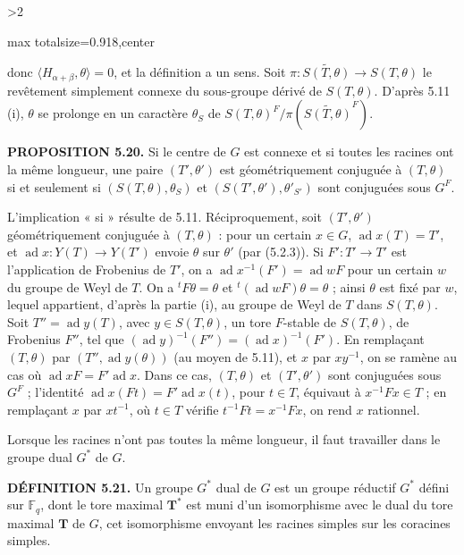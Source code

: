 \documentclass[9pt,twoside]{extarticle}
\newcommand{\EditionPage}[3]{%
  \ifnum#1>2\clearpage\fi
  \pdfbookmark[1]{Printed page #2}{fr-folio-#2}%
  \hypertarget{fr-physical-#1}{}%
  \noindent\begin{adjustbox}{max totalsize={\textwidth}{0.918\textheight},center}
  \begin{minipage}[t]{\textwidth}
  \fontsize{9.4}{11.1}\selectfont\justifying
  #3
  \end{minipage}
  \end{adjustbox}%
}
\begin{document}
\EditionPage{32}{133}{%
donc \(\langle H_{\alpha+\beta},\theta\rangle=0\), et la définition a un sens. Soit \(\pi:\widetilde{S(T,\theta)}\to S(T,\theta)\) le revêtement simplement connexe du sous-groupe dérivé de \(S(T,\theta)\). D'après 5.11 (i), \(\theta\) se prolonge en un caractère \(\theta_S\) de \(S(T,\theta)^F/\pi(\widetilde{S(T,\theta)}^F)\).\par

\noindent\textbf{PROPOSITION 5.20.} Si le centre de \(G\) est connexe et si toutes les racines ont la même longueur, une paire \((T',\theta')\) est géométriquement conjuguée à \((T,\theta)\) si et seulement si \((S(T,\theta),\theta_S)\) et \((S(T',\theta'),\theta'_{S'})\) sont conjuguées sous \(G^F\).\par

L'implication « si » résulte de 5.11. Réciproquement, soit \((T',\theta')\) géométriquement conjuguée à \((T,\theta)\) : pour un certain \(x\in G\), \(\operatorname{ad}x(T)=T'\), et \(\operatorname{ad}x:Y(T)\to Y(T')\) envoie \(\theta\) sur \(\theta'\) (par (5.2.3)). Si \(F':T'\to T'\) est l'application de Frobenius de \(T'\), on a \(\operatorname{ad}x^{-1}(F')=\operatorname{ad}wF\) pour un certain \(w\) du groupe de Weyl de \(T\). On a \({}^tF\theta=\theta\) et \({}^t(\operatorname{ad}wF)\theta=\theta\) ; ainsi \(\theta\) est fixé par \(w\), lequel appartient, d'après la partie (i), au groupe de Weyl de \(T\) dans \(S(T,\theta)\). Soit \(T''=\operatorname{ad}y(T)\), avec \(y\in S(T,\theta)\), un tore \(F\)-stable de \(S(T,\theta)\), de Frobenius \(F''\), tel que \((\operatorname{ad}y)^{-1}(F'')=(\operatorname{ad}x)^{-1}(F')\). En remplaçant \((T,\theta)\) par \((T'',\operatorname{ad}y(\theta))\) (au moyen de 5.11), et \(x\) par \(xy^{-1}\), on se ramène au cas où \(\operatorname{ad}xF=F'\operatorname{ad}x\). Dans ce cas, \((T,\theta)\) et \((T',\theta')\) sont conjuguées sous \(G^F\) ; l'identité \(\operatorname{ad}x(Ft)=F'\operatorname{ad}x(t)\), pour \(t\in T\), équivaut à \(x^{-1}Fx\in T\) ; en remplaçant \(x\) par \(xt^{-1}\), où \(t\in T\) vérifie \(t^{-1}Ft=x^{-1}Fx\), on rend \(x\) rationnel.\par

Lorsque les racines n'ont pas toutes la même longueur, il faut travailler dans le groupe dual \(G^*\) de \(G\).\par

\noindent\textbf{DÉFINITION 5.21.} Un groupe \(G^*\) dual de \(G\) est un groupe réductif \(G^*\) défini sur \(\mathbb F_q\), dont le tore maximal \(\mathbf T^*\) est muni d'un isomorphisme avec le dual du tore maximal \(\mathbf T\) de \(G\), cet isomorphisme envoyant les racines simples sur les coracines simples.\par

}
\end{document}
